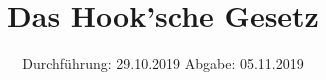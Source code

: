 

\subject{V803}
\title{Das Hook'sche Gesetz}
\date{%
  Durchführung: 29.10.2019
  \hspace{3em}
  Abgabe: 05.11.2019
}



\maketitle
\thispagestyle{empty}
\tableofcontents
\newpage





\printbibliography{}


